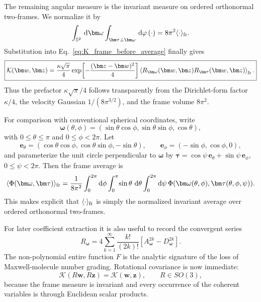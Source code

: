 \documentclass[11pt]{article}
\numberwithin{equation}{section}
\newcommand{\Sph}{\mathbb S}
\newcommand{\dd}{\,\mathrm d}
\theoremstyle{definition}
\begin{document}
The remaining angular measure is the invariant measure on ordered orthonormal
two-frames.  We normalize it by
\begin{equation}
 \int_{\Sph^2}\dd\bm\omega
 \int_{\bm\tau\perp\bm\omega}\dd\varphi\,(\cdot)
 =8\pi^2\langle\cdot\rangle_{\rm fr}.
 \label{eq:frame_average_definition}
\end{equation}
Substitution into Eq.~\eqref{eq:K_frame_before_average} finally gives
\begin{equation}
 \boxed{
 \mathcal K(\bm w,\bm z)
 =
 \frac{\kappa\sqrt\pi}{4}
 \exp\!\left[-\frac{(\bm z-\bm w)^2}{4}\right]
 \left\langle
 R_{\bm\omega}(\bm w,\bm z)
 R_{\bm\tau}(\bm w,\bm z)
 \right\rangle_{\rm fr}.
 }
 \label{eq:Kframe}
\end{equation}
Thus the prefactor $\kappa\sqrt\pi/4$ follows transparently from the
Dirichlet-form factor $\kappa/4$, the velocity Gaussian
$1/(8\pi^{3/2})$, and the frame volume $8\pi^2$.

For comparison with conventional spherical coordinates, write
\begin{equation}
 \bm\omega(\theta,\phi)
 =(
 \sin\theta\cos\phi,
 \sin\theta\sin\phi,
 \cos\theta),
\end{equation}
with $0\le\theta\le\pi$ and $0\le\phi<2\pi$.  Let
\begin{equation}
 \bm e_\theta
 =(
 \cos\theta\cos\phi,
 \cos\theta\sin\phi,
 -\sin\theta),
 \qquad
 \bm e_\phi=(-\sin\phi,\cos\phi,0),
\end{equation}
and parameterize the unit circle perpendicular to $\bm\omega$ by
$\bm\tau=\cos\psi\,\bm e_\theta+\sin\psi\,\bm e_\phi$,
$0\le\psi<2\pi$.  Then the frame average is
\begin{equation}
 \langle \Phi(\bm\omega,\bm\tau)\rangle_{\rm fr}
 =\frac{1}{8\pi^2}
 \int_0^{2\pi}\!\dd\phi
 \int_0^\pi\!\sin\theta\,\dd\theta
 \int_0^{2\pi}\!\dd\psi\,
 \Phi(\bm\omega(\theta,\phi),\bm\tau(\theta,\phi,\psi)).
 \label{eq:frame_average_spherical}
\end{equation}
This makes explicit that $\langle\cdot\rangle_{\rm fr}$ is simply the
normalized invariant average over ordered orthonormal two-frames.

For later coefficient extraction it is also useful to record the convergent
series
\begin{equation}
 R_{\bm\omega}
 =
 4\sum_{k=1}^{\infty}
 \frac{k!}{(2k)!}
 \left[
 A_{\bm\omega}^{2k}-D_{\bm\omega}^{2k}
 \right].
 \label{eq:Rseries}
\end{equation}
The non-polynomial entire function $F$ is the analytic signature of the loss
of Maxwell-molecule number grading.  Rotational covariance is now immediate:
\begin{equation}
 \mathcal K(R\bm w,R\bm z)=\mathcal K(\bm w,\bm z),
 \qquad R\in SO(3),
 \label{eq:rotcov}
\end{equation}
because the frame measure is invariant and every occurrence of the coherent
variables is through Euclidean scalar products.
\end{document}
